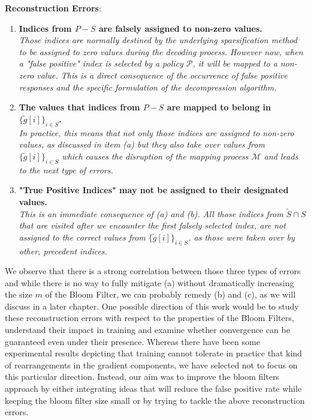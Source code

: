             \newpage
            {\bf Reconstruction Errors}:
            \begin{enumerate}[label=(\alph*)]
            
            \item {\bf Indices from $P-S$ are falsely assigned to non-zero values.} \\
            {\it Those indices are normally destined by the underlying sparsification method to be assigned to zero values during the decoding process. 
            However now, when a "false positive" index is selected by a policy $\mathcal{P}$, it will be mapped to a non-zero value.
            This is a direct consequence of the occurrence of false positive responses and the specific formulation of the decompression algorithm.}
            
            \item {\bf The values that indices from $P-S$ are mapped to belong in $\{\tilde{g}[i]\}_{i\in S}$. } \\
            {\it In practice, this means that not only those indices are assigned to non-zero values, as discussed in item (a) but they also take over values from $\{\tilde{g}[i]\}_{i\in S}$ which causes the disruption of the mapping process $\mathcal{M}$ and leads to the next type of errors.}
            
            \item {\bf "True Positive Indices" may not be assigned to their designated values.} \\
            {\it This is an immediate consequence of (a) and (b).
            All those indices from $\tilde{S} \cap S$ that are visited after we encounter the first falsely selected index, are not assigned to the correct values from $\{\tilde{g}[i]\}_{i\in S}$, as those were taken over by other, precedent indices.}
            
            \end{enumerate}
            
            We observe that there is a strong correlation between those three types of errors and while there is no way to fully mitigate (a) without dramatically increasing the size $m$ of the Bloom Filter, we can probably remedy (b) and (c), as we will discuss in a later chapter.
            One possible direction of this work would be to study these reconstruction errors with respect to the properties of the Bloom Filters, understand their impact in training and examine whether convergence can be guaranteed even under their presence.
            Whereas there have been some experimental results depicting that training cannot tolerate in practice that kind of rearrangements in the gradient components, we have selected not to focus on this particular direction. 
            Instead, our aim was to improve the bloom filters approach by either integrating ideas that will reduce the false positive rate while keeping the bloom filter size small or by trying to tackle the above reconstruction errors.


